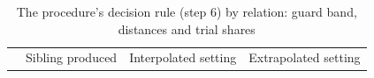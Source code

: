 \documentclass[pdflatex,sn-basic,lineno]{sn-jnl}
\newcommand{\tabsize}{\fontsize{8}{9.5}\selectfont}
\newcommand{\tabsizesmall}{\footnotesize}%
\providecommand{\DIFdelbegin}{} %
\providecommand{\DIFaddbeginFL}{} %
\providecommand{\DIFaddendFL}{} %
\providecommand{\DIFdelbeginFL}{} %
\providecommand{\DIFdelendFL}{} %
\newcommand{\DIFscaledelfig}{0.5}
\newlength{\DIFdelgraphicswidth} %
\newlength{\DIFdelgraphicsheight} %
\newcommand{\DIFaddincludegraphics}[2][]{{\color{blue}\fbox{\DIFOincludegraphics[#1]{#2}}}} %
\newcommand{\DIFdelincludegraphics}[2][]{%
\sbox{\DIFdelgraphicsbox}{\DIFOincludegraphics[#1]{#2}}%
\settoboxwidth{\DIFdelgraphicswidth}{\DIFdelgraphicsbox} %
\settoboxtotalheight{\DIFdelgraphicsheight}{\DIFdelgraphicsbox} %
\scalebox{\DIFscaledelfig}{%
\parbox[b]{\DIFdelgraphicswidth}{\usebox{\DIFdelgraphicsbox}\\[-\baselineskip] \rule{\DIFdelgraphicswidth}{0em}}\llap{\resizebox{\DIFdelgraphicswidth}{\DIFdelgraphicsheight}{%
\setlength{\unitlength}{\DIFdelgraphicswidth}%
\begin{picture}(1,1)%
\thicklines\linethickness{2pt} %
{\color[rgb]{1,0,0}\put(0,0){\framebox(1,1){}}}%
{\color[rgb]{1,0,0}\put(0,0){\line( 1,1){1}}}%
{\color[rgb]{1,0,0}\put(0,1){\line(1,-1){1}}}%
\end{picture}%
}\hspace*{3pt}}} %
} %
\DeclareRobustCommand{\DIFdelbegin}{\DIFOdelbegin \let\includegraphics\DIFdelincludegraphics} %
\DeclareRobustCommand{\DIFaddbeginFL}{\DIFOaddbeginFL \let\includegraphics\DIFaddincludegraphics} %
\DeclareRobustCommand{\DIFaddendFL}{\DIFOaddendFL \let\includegraphics\DIFOincludegraphics} %
\DeclareRobustCommand{\DIFdelbeginFL}{\DIFOdelbeginFL \let\includegraphics\DIFdelincludegraphics} %
\DeclareRobustCommand{\DIFdelendFL}{\DIFOaddendFL \let\includegraphics\DIFOincludegraphics} %
\begin{document}
\begin{appendices}
\DIFdelbegin %
\DIFdelendFL \DIFaddbeginFL \begin{table}[p]
\tabsizesmall
\DIFaddendFL \setlength{\tabcolsep}{2.2pt}
\caption{The procedure's decision rule (step 6) by relation: guard band, distances and trial shares}\label{tab:step6}
\DIFdelbeginFL %
\DIFdelendFL \DIFaddbeginFL \begin{tabular*}{\textwidth}{@{\extracolsep{\fill}}lrrrrrrrrrrrr@{}}
\toprule
 & \multicolumn{4}{c}{Sibling produced} & \multicolumn{4}{c}{Interpolated setting} & \multicolumn{4}{c}{Extrapolated setting} \\

\end{tabular*}
\end{table}
\end{appendices}
\end{document}
